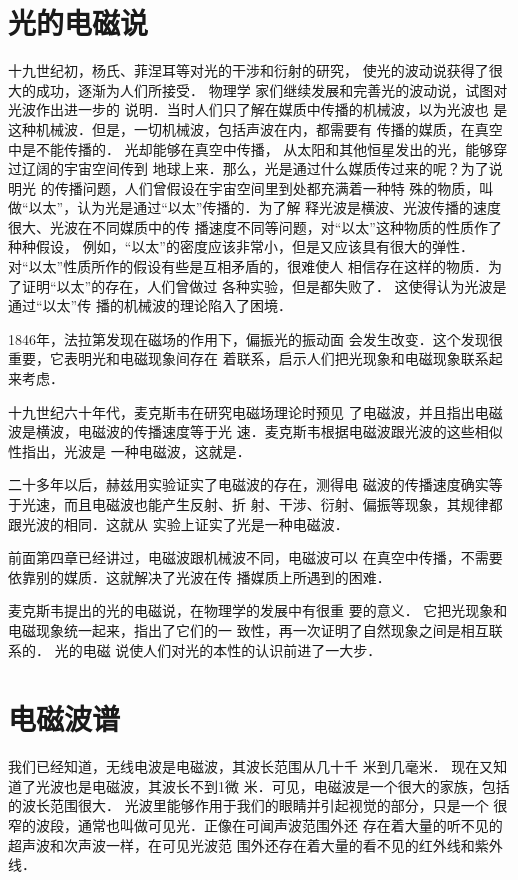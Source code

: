\section{光的电磁说}
十九世纪初，杨氏、菲涅耳等对光的干涉和衍射的研究，
使光的波动说获得了很大的成功，逐渐为人们所接受．
物理学
家们继续发展和完善光的波动说，试图对光波作出进一步的
说明．当时人们只了解在媒质中传播的机械波，以为光波也
是这种机械波．但是，一切机械波，包括声波在内，都需要有
传播的媒质，在真空中是不能传播的．
光却能够在真空中传播，
从太阳和其他恒星发出的光，能够穿过辽阔的宇宙空间传到
地球上来．那么，光是通过什么媒质传过来的呢？为了说明光
的传播问题，人们曾假设在宇宙空间里到处都充满着一种特
殊的物质，叫做“以太”，认为光是通过“以太”传播的．为了解
释光波是横波、光波传播的速度很大、光波在不同媒质中的传
播速度不同等问题，对“以太”这种物质的性质作了种种假设，
例如，“以太”的密度应该非常小，但是又应该具有很大的弹性．
对“以太”性质所作的假设有些是互相矛盾的，很难使人
相信存在这样的物质．为了证明“以太”的存在，人们曾做过
各种实验，但是都失败了．
这使得认为光波是通过“以太”传
播的机械波的理论陷入了困境．

1846年，法拉第发现在磁场的作用下，偏振光的振动面
会发生改变．这个发现很重要，它表明光和电磁现象间存在
着联系，启示人们把光现象和电磁现象联系起来考虑．

十九世纪六十年代，麦克斯韦在研究电磁场理论时预见
了电磁波，并且指出电磁波是横波，电磁波的传播速度等于光
速．麦克斯韦根据电磁波跟光波的这些相似性指出，光波是
一种电磁波，这就是．

二十多年以后，赫兹用实验证实了电磁波的存在，测得电
磁波的传播速度确实等于光速，而且电磁波也能产生反射、折
射、干涉、衍射、偏振等现象，其规律都跟光波的相同．这就从
实验上证实了光是一种电磁波．

前面第四章已经讲过，电磁波跟机械波不同，电磁波可以
在真空中传播，不需要依靠别的媒质．这就解决了光波在传
播媒质上所遇到的困难．

麦克斯韦提出的光的电磁说，在物理学的发展中有很重
要的意义．
它把光现象和电磁现象统一起来，指出了它们的一
致性，再一次证明了自然现象之间是相互联系的．
光的电磁
说使人们对光的本性的认识前进了一大步．

\section{电磁波谱}
我们已经知道，无线电波是电磁波，其波长范围从几十千
米到几毫米．
现在又知道了光波也是电磁波，其波长不到1微
米．可见，电磁波是一个很大的家族，包括的波长范围很大．
光波里能够作用于我们的眼睛并引起视觉的部分，只是一个
很窄的波段，通常也叫做可见光．正像在可闻声波范围外还
存在着大量的听不见的超声波和次声波一样，在可见光波范
围外还存在着大量的看不见的红外线和紫外线．


